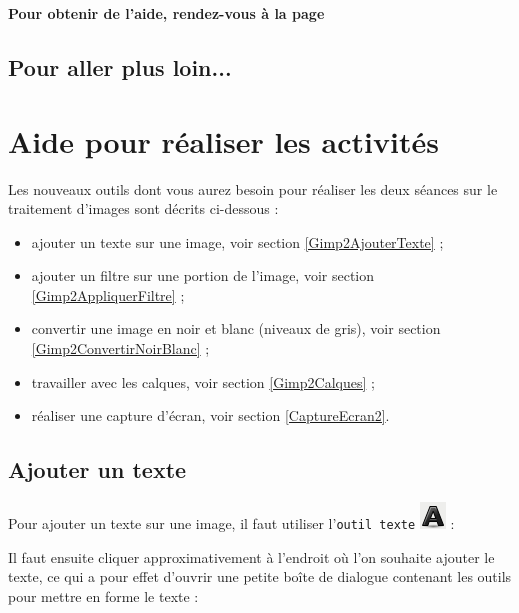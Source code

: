 \textbf{Pour obtenir de l'aide, rendez-vous à la page \pageref{Image5eOutils}}

\subsection{Pour aller plus loin...}


\newpage

\section{Aide pour réaliser les activités}\label{Image5eOutils}
 
Les nouveaux outils dont vous aurez besoin pour réaliser les deux séances sur le traitement d'images sont décrits ci-dessous :

\begin{itemize}   
\item ajouter un texte sur une image, voir section \vref{Gimp2AjouterTexte} ;
\item ajouter un filtre sur une portion de l'image, voir section \vref{Gimp2AppliquerFiltre} ;
\item convertir une image en noir et blanc (niveaux de gris), voir section \vref{Gimp2ConvertirNoirBlanc} ;
\item travailler avec les calques, voir section \vref{Gimp2Calques} ;   
\item réaliser une capture d'écran, voir section \vref{CaptureEcran2}.
\end{itemize}  



\subsection{Ajouter un texte}\label{Gimp2AjouterTexte}

Pour ajouter un texte sur une image, il faut utiliser l'\texttt{outil texte} \includegraphics[width=.6cm]{./images/image02/iconeTexte} :


Il faut ensuite cliquer approximativement à l'endroit où l'on souhaite ajouter le texte, ce qui a pour effet d'ouvrir une petite boîte de dialogue contenant les outils pour mettre en forme le texte :

